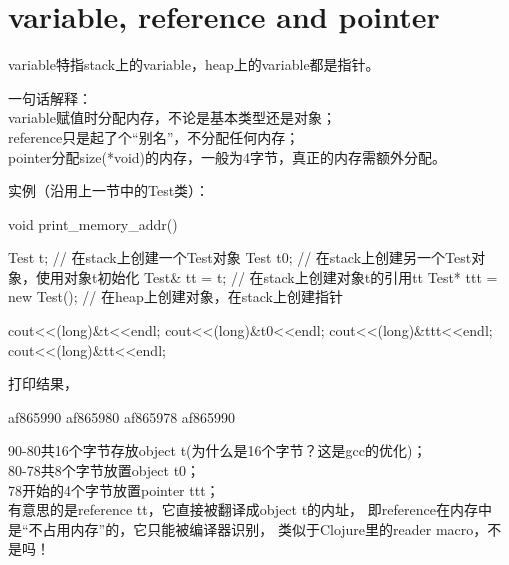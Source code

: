 ﻿\section[variable, reference and pointer]{variable, reference and pointer}
variable特指stack上的variable，heap上的variable都是指针。

一句话解释：\\
variable赋值时分配内存，不论是基本类型还是对象；\\
reference只是起了个“别名”，不分配任何内存；\\
pointer分配size(*void)的内存，一般为4字节，真正的内存需额外分配。

实例（沿用上一节中的Test类）：

\begin{cppcode}
void print_memory_addr() {
    Test t;   // 在stack上创建一个Test对象
    Test t0;  // 在stack上创建另一个Test对象，使用对象t初始化
    Test& tt = t; // 在stack上创建对象t的引用tt
    Test* ttt = new Test(); // 在heap上创建对象，在stack上创建指针

    cout<<(long)&t<<endl;
    cout<<(long)&t0<<endl;
    cout<<(long)&ttt<<endl;
    cout<<(long)&tt<<endl;
}
\end{cppcode}

打印结果，

\begin{bashcode}
af865990
af865980
af865978
af865990
\end{bashcode}

90-80共16个字节存放object t(为什么是16个字节？这是gcc的优化)；\\
80-78共8个字节放置object t0；\\
78开始的4个字节放置pointer ttt；\\
有意思的是reference tt，它直接被翻译成object t的内址，
即reference在内存中是“不占用内存”的，它只能被编译器识别，
类似于Clojure里的reader macro，不是吗！
